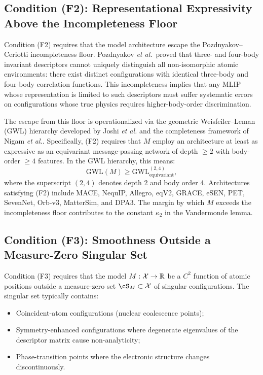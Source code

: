 \subsection{Condition (F2): Representational Expressivity Above the Incompleteness Floor}

Condition (F2) requires that the model architecture escape the Pozdnyakov--Ceriotti incompleteness floor\cite{pozdnyakov2020incompleteness}. Pozdnyakov \emph{et al.}\ proved that three- and four-body invariant descriptors cannot uniquely distinguish all non-isomorphic atomic environments: there exist distinct configurations with identical three-body and four-body correlation functions. This incompleteness implies that any MLIP whose representation is limited to such descriptors must suffer systematic errors on configurations whose true physics requires higher-body-order discrimination.

The escape from this floor is operationalized via the geometric Weisfeiler--Leman (GWL) hierarchy developed by Joshi \emph{et al.}\cite{joshi2023expressive} and the completeness framework of Nigam \emph{et al.}\cite{nigam2023completeness}. Specifically, (F2) requires that $M$ employ an architecture at least as expressive as an equivariant message-passing network of depth $\geq 2$ with body-order $\geq 4$ features. In the GWL hierarchy, this means:
\begin{equation}\label{eq:f2-gwl}
    \text{GWL}(M) \geq \text{GWL}_{\text{equivariant}}^{(2,4)},
\end{equation}
where the superscript $(2,4)$ denotes depth 2 and body order 4. Architectures satisfying (F2) include MACE\cite{batatia2022mace}, NequIP\cite{batzner2022nequip}, Allegro\cite{musaelian2023allegro}, eqV2\cite{liao2024equiformerv2}, GRACE\cite{bochkarev2024grace}, eSEN\cite{om枯萎}, PET\cite{batatia2024pet}, SevenNet\cite{park2024sevennet}, Orb-v3\cite{qian2023orb}, MatterSim\cite{yang2024mattersim}, and DPA3\cite{zhang2024dpa3}. The margin by which $M$ exceeds the incompleteness floor contributes to the constant $\kappa_2$ in the Vandermonde lemma.

\subsection{Condition (F3): Smoothness Outside a Measure-Zero Singular Set}

Condition (F3) requires that the model $M: \mathcal{X} \to \mathbb{R}$ be a $C^2$ function of atomic positions outside a measure-zero set $\cS_M \subset \cX$ of singular configurations. The singular set typically contains:
\begin{itemize}
    \item Coincident-atom configurations (nuclear coalescence points);
    \item Symmetry-enhanced configurations where degenerate eigenvalues of the descriptor matrix cause non-analyticity;
    \item Phase-transition points where the electronic structure changes discontinuously.
\end{itemize}

